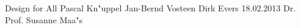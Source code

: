 \documentclass{header}
\begin{document}
        	{Design for All}
			{Pascal Kn"uppel}
			{Jan-Bernd Vosteen}
			{Dirk Evers}
			{18.02.2013}
			{Dr. Prof. Susanne Maa"s}
         
\pagestyle{empty}
 \tableofcontents
 
\newpage
\pagestyle{fancy}
 \setcounter{page}{1}  










 
\end{document}

